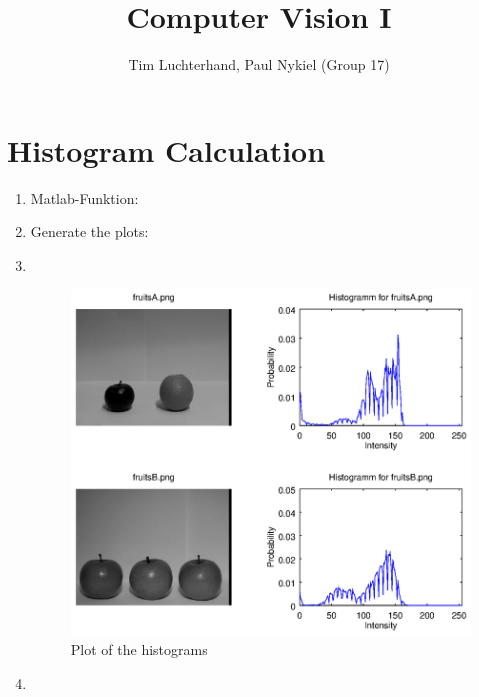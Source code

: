 \documentclass[DIN, pagenumber=false, fontsize=11pt, parskip=half]{scrartcl}
\title{Computer Vision I}
\author{Tim Luchterhand, Paul Nykiel (Group 17)}
\begin{document}
    \maketitle
    \section{Histogram Calculation}
    \begin{enumerate}
        \item Matlab-Funktion: 
        \item Generate the plots: 
        \item  $ $
            \begin{figure}[H]
                \centering
                \includegraphics[trim = {0 9cm 27cm 0}, clip,width=\textwidth]{Histograms}
                \caption{Plot of the histograms}
            \end{figure} 
        \item $ $
            \begin{figure}[H]
                \centering
\end{figure}
\end{enumerate}
\end{document}
